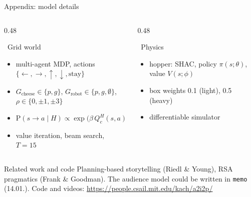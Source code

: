 \documentclass[aspectratio=169,10pt]{beamer}
\newcommand{\Prob}{\mathrm{P}}
\newcommand{\tightitem}{\itemsep0.3em}
\newcommand{\slideendspace}{\vspace{0.3em}}
\begin{document}
\begin{frame}{Appendix: model details}
\small
\begin{columns}[T,onlytextwidth]

\begin{column}{0.48\textwidth}
\begin{block}{\faRobot\ Grid world}
\begin{itemize}\tightitem
  \item multi-agent MDP, actions $\{\leftarrow,\rightarrow,\uparrow,\downarrow,\text{stay}\}$
  \item $G_{\text{cheese}}\in\{p,g\}$, $G_{\text{robot}}\in\{p,g,\emptyset\}$, $\rho\in\{0,\pm1,\pm3\}$
  \item $\Prob(s\to a\mid H)\propto\exp\big(\beta\, Q^H_c(s,a)\big)$
  \item value iteration, beam search, $T=15$
\end{itemize}
\end{block}
\end{column}

\begin{column}{0.48\textwidth}
\begin{block}{\faCogs\ Physics}
\begin{itemize}\tightitem
  \item hopper: SHAC, policy $\pi(s;\theta)$, value $V(s;\phi)$
  \item box weights 0.1 (light), 0.5 (heavy)
  \item differentiable simulator
\end{itemize}
\end{block}
\end{column}

\end{columns}

\slideendspace
\begin{block}{Related work and code}
\footnotesize
Planning-based storytelling (Riedl \& Young), RSA pragmatics (Frank \& Goodman). The audience model could be written in \texttt{memo} (14.01.).
Code and videos: \url{https://people.csail.mit.edu/kach/a2i2p/}
\end{block}
\end{frame}
\end{document}
